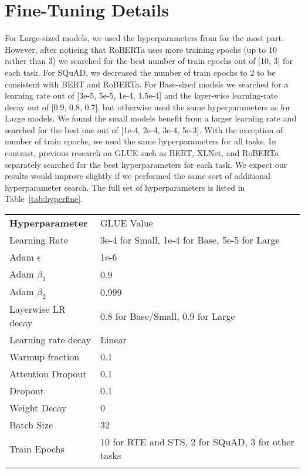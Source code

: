 \documentclass{article}
\newcommand\tstrut{\rule{0pt}{2.6ex}}
\newcommand\bstrut{\rule[-1.0ex]{0pt}{0pt}}
\newcommand{\thinline}{\Xhline{1.5\arrayrulewidth}}
\newcommand{\thickline}{\Xhline{2.5\arrayrulewidth}}
\newcommand{\tsep}	{\bstrut \\ \thinline}
\newcommand{\ttop}{\thickline}
\newcommand{\tbottom}{\bstrut \\ \thickline}
\begin{document}
\section{Fine-Tuning Details}
\label{app:fine}
For Large-sized models, we used the hyperparameters from \citet{Clark2019BAMBM} for the most part.
However, after noticing that RoBERTa \citep{liu2019roberta} uses more training epochs (up to 10 rather than 3) we searched for the best number of train epochs out of [10, 3] for each task. 
For SQuAD, we decreased the number of train epochs to 2 to be consistent with BERT and RoBERTa.
For Base-sized models we searched for a learning rate out of [3e-5, 5e-5, 1e-4, 1.5e-4] and the layer-wise learning-rate decay out of [0.9, 0.8, 0.7], but otherwise used the same hyperparameters as for Large models. 
We found the small models benefit from a larger learning rate and searched for the best one out of [1e-4, 2e-4, 3e-4, 5e-3].
With the exception of number of train epochs, we used the same hyperparameters for all tasks.
In contrast, previous research on GLUE such as BERT, XLNet, and RoBERTa separately searched for the best hyperparameters for each task. 
We expect our results would improve slightly if we performed the same sort of additional hyperparameter search.
The full set of hyperparameters is listed in Table~\ref{tab:hyperfine}.

\addtolength{\tabcolsep}{0pt}
\begin{table*}[t!]
\begin{center}
\begin{tabular}{l l}
\ttop
\textbf{Hyperparameter} & GLUE Value \tstrut \tsep
Learning Rate & 3e-4 for Small, 1e-4 for Base, 5e-5 for Large \tstrut \\
Adam $\epsilon$ & 1e-6  \\
Adam $\beta_1$ & 0.9  \\
Adam $\beta_2$ & 0.999 \\
Layerwise LR decay & 0.8 for Base/Small, 0.9 for Large  \\
Learning rate decay & Linear \\
Warmup fraction & 0.1 \\
Attention Dropout & 0.1  \\
Dropout & 0.1  \\
Weight Decay & 0 \\
Batch Size & 32 \\
Train Epochs & 10 for RTE and STS, 2 for SQuAD, 3 for other tasks 
\tbottom
\end{tabular} 
\end{center}
\caption{Fine-tune hyperparameters}
\label{tab:hyperfine}
\end{table*}
\addtolength{\tabcolsep}{0pt}
\end{document}
